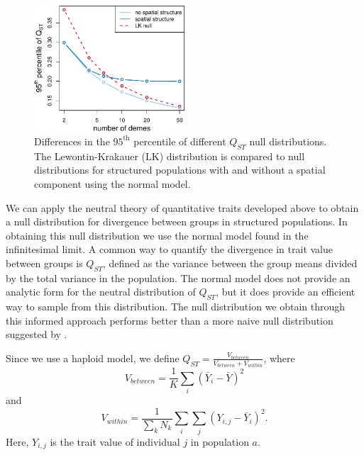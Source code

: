 \begin{figure}
  \centering
  \includegraphics[width=0.5\textwidth]{figures/qst_deme_percentile_nospace.pdf}
  \caption{\small Differences in the $95^{\mathrm{th}}$ percentile of different
    $Q_{ST}$ null distributions. The Lewontin-Krakauer (LK) distribution is
    compared to null distributions for structured populations with and without a
    spatial component using the normal model.}
  \label{fig:qst_perc}
\end{figure}

We can apply the neutral theory of quantitative traits developed above to obtain
a null distribution for divergence between groups in structured populations. In
obtaining this null distribution we use the normal model found in the
infinitesimal limit. A common way to quantify the divergence in trait value
between groups is $Q_{ST}$, defined as the variance between the group means
divided by the total variance in the population. The normal model does not
provide an analytic form for the neutral distribution of $Q_{ST}$, but it does
provide an efficient way to sample from this distribution. The null distribution
we obtain through this informed approach performs better than a more naive
null distribution suggested by \citet{Whitlock2009}. 

Since we use a haploid model, we define $Q_{ST} = \frac{V_{between}}{V_{between}
  + V_{within}}$, where
\begin{equation*}
  V_{between} = \frac{1}{K} \sum_i \left( \bar{Y}_i - \bar{Y} \right)^2
\end{equation*}
and
\begin{equation*}
  V_{within} = \frac{1}{\sum_k N_k} \sum_i \sum_j \left( Y_{i,j} - \bar{Y}_i \right)^2.
\end{equation*}
Here, $Y_{i,j}$ is the trait value of individual $j$ in population $a$.

